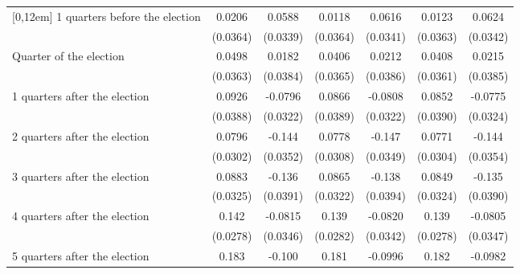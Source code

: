 \begin{table}[!ht]
\begin{tabular}{l*{6}{c}}
[0,12em]
 1 quarters before the election&      0.0206         &      0.0588         &      0.0118         &      0.0616         &      0.0123         &      0.0624         \\
                    &    (0.0364)         &    (0.0339)         &    (0.0364)         &    (0.0341)         &    (0.0363)         &    (0.0342)         \\
[0,12em]
Quarter of the election&      0.0498         &      0.0182         &      0.0406         &      0.0212         &      0.0408         &      0.0215         \\
                    &    (0.0363)         &    (0.0384)         &    (0.0365)         &    (0.0386)         &    (0.0361)         &    (0.0385)         \\
[0,12em]
 1 quarters after the election&      0.0926\sym{*}  &     -0.0796\sym{*}  &      0.0866\sym{*}  &     -0.0808\sym{*}  &      0.0852\sym{*}  &     -0.0775\sym{*}  \\
                    &    (0.0388)         &    (0.0322)         &    (0.0389)         &    (0.0322)         &    (0.0390)         &    (0.0324)         \\
[0,12em]
 2 quarters after the election&      0.0796\sym{**} &      -0.144\sym{***}&      0.0778\sym{*}  &      -0.147\sym{***}&      0.0771\sym{*}  &      -0.144\sym{***}\\
                    &    (0.0302)         &    (0.0352)         &    (0.0308)         &    (0.0349)         &    (0.0304)         &    (0.0354)         \\
[0,12em]
 3 quarters after the election&      0.0883\sym{**} &      -0.136\sym{***}&      0.0865\sym{**} &      -0.138\sym{***}&      0.0849\sym{**} &      -0.135\sym{***}\\
                    &    (0.0325)         &    (0.0391)         &    (0.0322)         &    (0.0394)         &    (0.0324)         &    (0.0390)         \\
[0,12em]
 4 quarters after the election&       0.142\sym{***}&     -0.0815\sym{*}  &       0.139\sym{***}&     -0.0820\sym{*}  &       0.139\sym{***}&     -0.0805\sym{*}  \\
                    &    (0.0278)         &    (0.0346)         &    (0.0282)         &    (0.0342)         &    (0.0278)         &    (0.0347)         \\
[0,12em]
 5 quarters after the election&       0.183\sym{***}&      -0.100\sym{**} &       0.181\sym{***}&     -0.0996\sym{**} &       0.182\sym{***}&     -0.0982\sym{**} \\

\end{tabular}
\end{table}
